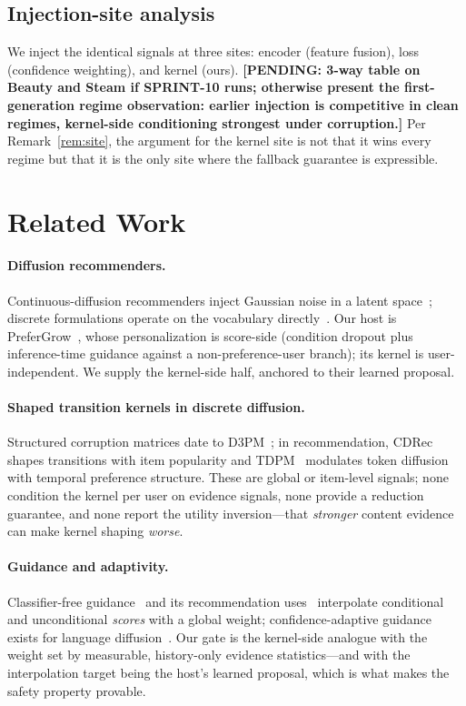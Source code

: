 \documentclass[letterpaper]{article}
\newcommand{\pending}[1]{{\color{red}\textbf{[PENDING: #1]}}}
\begin{document}
\subsection{Injection-site analysis}
\label{sec:threeway}

We inject the identical signals at three sites: encoder (feature
fusion), loss (confidence weighting), and kernel (ours).
\pending{3-way table on Beauty and Steam if SPRINT-10 runs; otherwise
present the first-generation regime observation: earlier injection is
competitive in clean regimes, kernel-side conditioning strongest under
corruption.} Per Remark~\ref{rem:site}, the argument for the kernel
site is not that it wins every regime but that it is the only site
where the fallback guarantee is expressible.

\section{Related Work}
\label{sec:related}

\paragraph{Diffusion recommenders.}
Continuous-diffusion recommenders inject Gaussian noise in a latent
space~\cite{dreamrec,diffurec,preferdiff}; discrete formulations
operate on the vocabulary directly~\cite{prefergrow,llada-rec}. Our
host is PreferGrow~\cite{prefergrow}, whose personalization is
score-side (condition dropout plus inference-time guidance against a
non-preference-user branch); its kernel is user-independent. We supply
the kernel-side half, anchored to their learned proposal.

\paragraph{Shaped transition kernels in discrete diffusion.}
Structured corruption matrices date to D3PM~\cite{d3pm}; in
recommendation, CDRec~\cite{cdrec} shapes transitions with item
popularity and TDPM~\cite{tdpm} modulates token diffusion with temporal
preference structure. These are global or item-level signals; none
condition the kernel per user on evidence signals, none provide a
reduction guarantee, and none report the utility inversion---that
\emph{stronger} content evidence can make kernel shaping \emph{worse}.

\paragraph{Guidance and adaptivity.}
Classifier-free guidance~\cite{cfg} and its recommendation
uses~\cite{cfgrec} interpolate conditional and unconditional
\emph{scores} with a global weight; confidence-adaptive guidance exists
for language diffusion~\cite{acfg}. Our gate is the kernel-side
analogue with the weight set by measurable, history-only evidence
statistics---and with the interpolation target being the host's learned
proposal, which is what makes the safety property provable.
\end{document}
